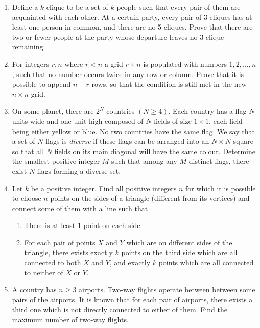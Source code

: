 \documentclass{article}
\begin{document}
\begin{enumerate}
	\item %
	Define a $k$-clique to be a set of $k$ people such that every pair of them are acquainted with each other. At a certain party, every pair of 3-cliques has at least one person in common, and there are no 5-cliques. Prove that there are two or fewer people at the party whose departure leaves no 3-clique remaining.	
	
	\item 
	For integers $r,n$ where $r<n$ a grid $r \times n$ is populated with numbers $1,2,\dots,n$, such that no number occurs twice in any row or column. Prove that it is possible to append $n-r$ rows, so that the condition is still met in the new $n \times n$ grid.
	
	\item %
	On some planet, there are $2^N$ countries $(N \geq 4)$. Each country has a flag $N$ units wide and one unit high composed of $N$ fields of size $1 \times 1$, each field being either yellow or blue. No two countries have the same flag. We say that a set of $N$ flags is \emph{diverse} if these flags can be arranged into an $N \times N$ square so that all $N$ fields on its main diagonal will have the same colour. Determine the smallest positive integer $M$ such that among any $M$ distinct flags, there exist $N$ flags forming a diverse set.
	
	\item %
	Let $k$ be a positive integer. Find all positive integers $n$ for which it is possible to choose $n$ points on the sides of a triangle (different from its vertices) and connect some of them with a line such that
	\begin{enumerate}
		\item There is at least $1$ point on each side
		\item For each pair of points $X$ and $Y$ which are on different sides of the triangle, there exists exactly $k$ points on the third side which are all connected to both $X$ and $Y$, and exactly $k$ points which are all connected to neither of $X$ or $Y$.
	\end{enumerate}
	
	\item %
	A country has $n \geq 3$ airports. Two-way flights operate between between some pairs of the airports. It is known that for each pair of airports, there exists a third one which is not directly connected to either of them. Find the maximum number of two-way flights.

\end{enumerate}
\end{document}
